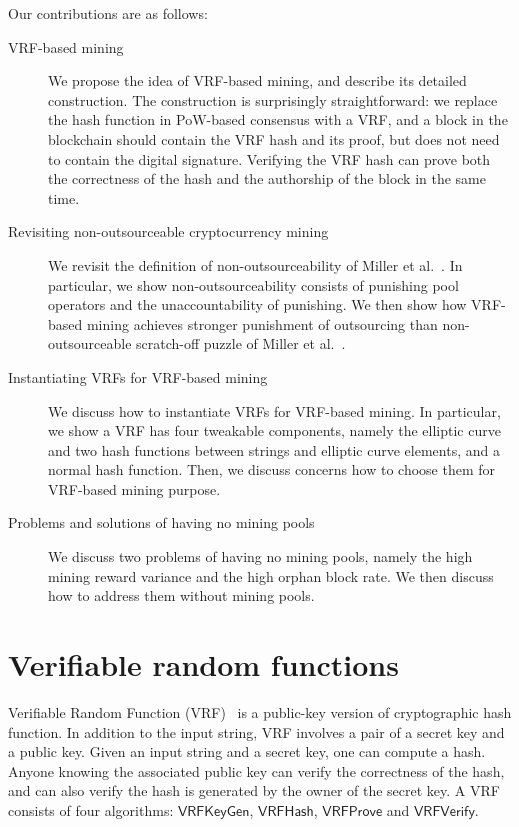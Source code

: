 \documentclass[a0,portrait]{a0poster}
\begin{document}
\begin{multicols}{2}
    Our contributions are as follows:

    \begin{description}
        \item [VRF-based mining] We propose the idea of VRF-based mining, and describe its detailed construction. The construction is surprisingly straightforward: we replace the hash function in PoW-based consensus with a VRF, and a block in the blockchain should contain the VRF hash and its proof, but does not need to contain the digital signature. Verifying the VRF hash can prove both the correctness of the hash and the authorship of the block in the same time.
        \item [Revisiting non-outsourceable cryptocurrency mining] We revisit the definition of non-outsourceability of Miller et al.~\cite{miller2015nonoutsourceable}. In particular, we show non-outsourceability consists of punishing pool operators and the unaccountability of punishing. We then show how VRF-based mining achieves stronger punishment of outsourcing than non-outsourceable scratch-off puzzle of Miller et al.~\cite{miller2015nonoutsourceable}.
        \item [Instantiating VRFs for VRF-based mining] We discuss how to instantiate VRFs for VRF-based mining. In particular, we show a VRF has four tweakable components, namely the elliptic curve and two hash functions between strings and elliptic curve elements, and a normal hash function. Then, we discuss concerns how to choose them for VRF-based mining purpose.
        \item [Problems and solutions of having no mining pools] We discuss two problems of having no mining pools, namely the high mining reward variance and the high orphan block rate. We then discuss how to address them without mining pools.
    \end{description}




    \color{DarkSlateGray} %

    \section*{Verifiable random functions}
    Verifiable Random Function (VRF)~\cite{micali1999verifiable} is a public-key version of cryptographic hash function.
    In addition to the input string, VRF involves a pair of a secret key and a public key.
    Given an input string and a secret key, one can compute a hash.
    Anyone knowing the associated public key can verify the correctness of the hash, and can also verify the hash is generated by the owner of the secret key.
    A VRF consists of four algorithms: $\mathsf{VRFKeyGen}$, $\mathsf{VRFHash}$, $\mathsf{VRFProve}$ and $\mathsf{VRFVerify}$.


\end{multicols}
\end{document}
